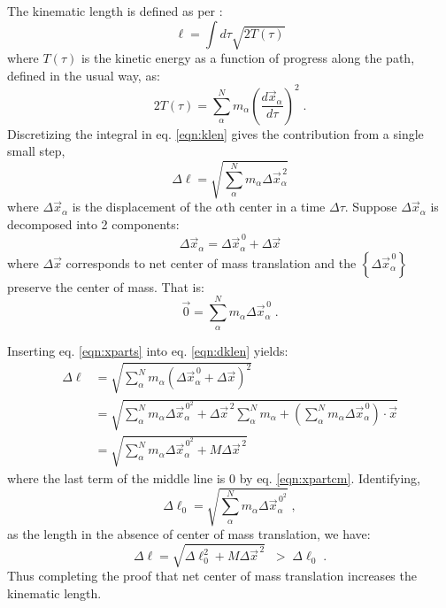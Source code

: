 \documentclass[letterpaper,12pt]{article}
\newcommand{\svec}[1]{\vec{#1}}
\newcommand{\refeq}[1]{eq. \ref{eqn:#1}}
\newcommand{\laeq}[1]{\label{eqn:#1}}
\begin{document}
The kinematic length is defined as per \cite{wang:2007:geodesics}:
\begin{equation}\label{eqn:klen}
\ell = \int d\tau\sqrt{2 T(\tau)}
\end{equation}
where $T(\tau)$ is the kinetic energy as a function of progress along the path, defined in the usual way, as:
\begin{equation}
2T(\tau) = \sum_{\alpha}^{N} m_{\alpha} \left( \frac{d\svec{x}_{\alpha}}{d\tau} \right)^2 \; .
\end{equation}
Discretizing the integral in \refeq{klen} gives the contribution from a single small step,
\begin{equation} \laeq{dklen}
\Delta \ell = \sqrt{\sum_{\alpha}^{N} m_{\alpha} \Delta \svec{x}_{\alpha}^{\,2}}
\end{equation}
where $\Delta \svec{x}_{\alpha}$ is the displacement of the $\alpha$th center in a time $\Delta \tau$. Suppose $\Delta \svec{x}_{\alpha}$ is decomposed into 2 components:
\begin{equation} \laeq{xparts}
\Delta \svec{x}_{\alpha} = \Delta \svec{x}_{\alpha}^{\,0} + \Delta \svec{x}
\end{equation}
where $\Delta \svec{x}$ corresponds to net center of mass translation and the $\left\{ \Delta \svec{x}_{\alpha}^{\,0} \right\}$ preserve the center of mass. That is:
\begin{equation} \laeq{xpartcm}
\svec{0} = \sum_{\alpha}^N m_{\alpha} \Delta \svec{x}_{\alpha}^{\,0} \; .
\end{equation}

Inserting \refeq{xparts} into \refeq{dklen} yields:
\begin{equation}
\begin{aligned}
\Delta \ell &= \sqrt{\sum_{\alpha}^{N} m_{\alpha} \left(\Delta \svec{x}_{\alpha}^{\,0} + \Delta \svec{x} \right)^{2}} \\
&= \sqrt{\sum_{\alpha}^{N} m_{\alpha} \Delta \svec{x}_{\alpha}^{\,0^{2}} + \Delta \svec{x}^{\,2}\sum_{\alpha}^{N} m_{\alpha} + \left(\sum_{\alpha}^{N} m_{\alpha} \Delta \svec{x}_{\alpha}^{\,0} \right) \cdot \svec{x}} \\
&=  \sqrt{\sum_{\alpha}^{N} m_{\alpha} \Delta \svec{x}_{\alpha}^{\,0^{2}} + M\Delta \svec{x}^{\,2}}
\end{aligned}
\end{equation}
where the last term of the middle line is 0 by \refeq{xpartcm}. Identifying, 
\begin{equation}
\Delta {\ell}_{0} = \sqrt{\sum_{\alpha}^{N} m_{\alpha} \Delta \svec{x}_{\alpha}^{\,0^2}} \; ,
\end{equation}
as the length in the absence of center of mass translation, we have:
\begin{equation}
\Delta \ell = \sqrt{\Delta {\ell}_{0}^{2} + M\Delta \svec{x}^{\,2}} \;\; > \; \Delta {\ell}_{0} \; .
\end{equation}
Thus completing the proof that net center of mass translation increases the kinematic length.
\end{document}
